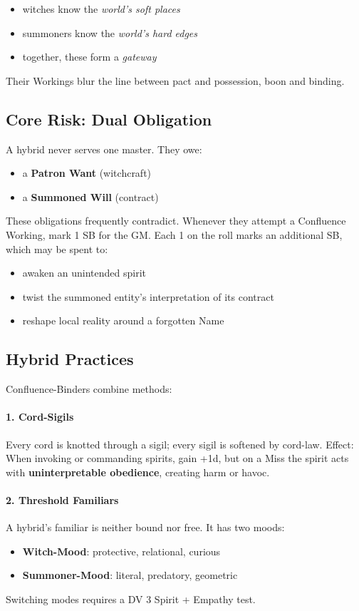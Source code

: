 \documentclass[11pt]{book}
\begin{document}
\begin{itemize}[leftmargin=1.5em]
    \item witches know the \emph{world's soft places}  
    \item summoners know the \emph{world's hard edges}
    \item together, these form a \emph{gateway}
\end{itemize}

Their Workings blur the line between pact and possession, boon and binding.

\subsection*{Core Risk: Dual Obligation}
A hybrid never serves one master.  
They owe:
\begin{itemize}[leftmargin=1.5em]
    \item a \textbf{Patron Want} (witchcraft)  
    \item a \textbf{Summoned Will} (contract)
\end{itemize}

These obligations frequently contradict.  
Whenever they attempt a Confluence Working, mark 1 SB for the GM.  
Each 1 on the roll marks an additional SB, which may be spent to:

\begin{itemize}[leftmargin=1.5em]
    \item awaken an unintended spirit  
    \item twist the summoned entity's interpretation of its contract  
    \item reshape local reality around a forgotten Name  
\end{itemize}

\subsection*{Hybrid Practices}
Confluence-Binders combine methods:

\paragraph{1. Cord-Sigils}  
Every cord is knotted through a sigil; every sigil is softened by cord-law.  
Effect: When invoking or commanding spirits, gain +1d, but on a Miss the spirit acts with
\textbf{uninterpretable obedience}, creating harm or havoc.

\paragraph{2. Threshold Familiars}  
A hybrid's familiar is neither bound nor free.  
It has two moods:
\begin{itemize}
    \item \textbf{Witch-Mood}: protective, relational, curious  
    \item \textbf{Summoner-Mood}: literal, predatory, geometric
\end{itemize}
Switching modes requires a DV 3 Spirit + Empathy test.
\end{document}
